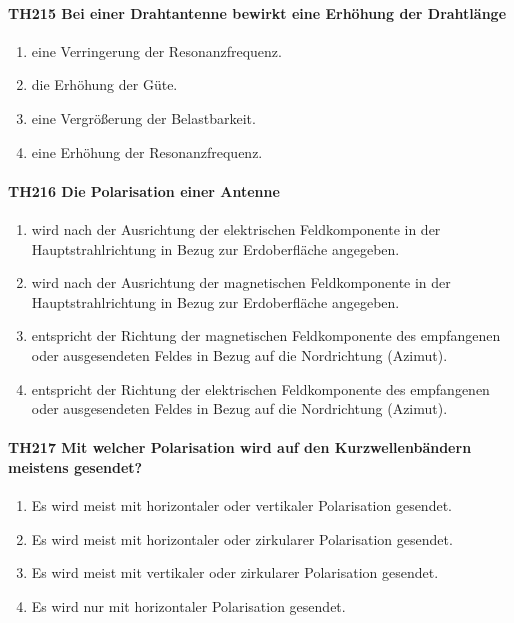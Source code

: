 \documentclass[8pt]{article}
\begin{document}
\paragraph*{TH215 Bei einer Drahtantenne bewirkt eine Erhöhung der Drahtlänge} 
\begin{enumerate}[nolistsep,label=\Alph*]
\item eine Verringerung der Resonanzfrequenz.
\item die Erhöhung der Güte.
\item eine Vergrößerung der Belastbarkeit.
\item eine Erhöhung der Resonanzfrequenz.
\end{enumerate}

\paragraph*{TH216 Die Polarisation einer Antenne} 
\begin{enumerate}[nolistsep,label=\Alph*]
\item wird nach der Ausrichtung der elektrischen Feldkomponente in der Hauptstrahlrichtung in Bezug zur Erdoberfläche angegeben.
\item wird nach der Ausrichtung der magnetischen Feldkomponente in der Hauptstrahlrichtung in Bezug zur Erdoberfläche angegeben.
\item entspricht der Richtung der magnetischen Feldkomponente des empfangenen oder ausgesendeten Feldes in Bezug auf die Nordrichtung (Azimut).
\item entspricht der Richtung der elektrischen Feldkomponente des empfangenen oder ausgesendeten Feldes in Bezug auf die Nordrichtung (Azimut).
\end{enumerate}

\paragraph*{TH217 Mit welcher Polarisation wird auf den Kurzwellenbändern meistens gesendet?} 
\begin{enumerate}[nolistsep,label=\Alph*]
\item Es wird meist mit horizontaler oder vertikaler Polarisation gesendet. 
\item Es wird meist mit horizontaler oder zirkularer Polarisation gesendet.
\item Es wird meist mit vertikaler oder zirkularer Polarisation gesendet.
\item Es wird nur mit horizontaler Polarisation gesendet. 
\end{enumerate}
\end{document}
